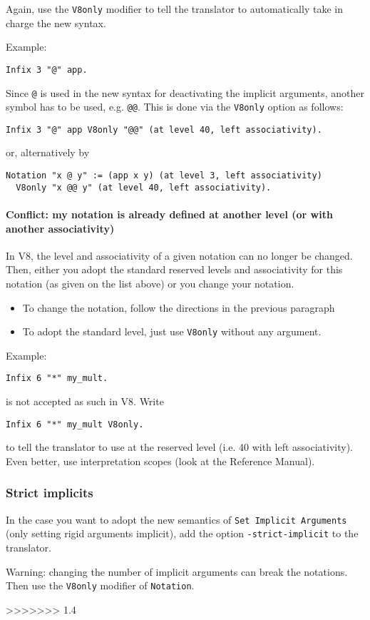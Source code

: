 \documentclass[11pt,a4paper]{article}
\begin{document}
Again, use the {\tt V8only} modifier to tell the translator to
automatically take in charge the new syntax.

Example:
\begin{verbatim}
Infix 3 "@" app.
\end{verbatim}
Since {\tt @} is used in the new syntax for deactivating the implicit
arguments, another symbol has to be used, e.g. {\tt @@}. This is done via
the {\tt V8only} option as follows:
\begin{verbatim}
Infix 3 "@" app V8only "@@" (at level 40, left associativity).
\end{verbatim}
or, alternatively by
\begin{verbatim}
Notation "x @ y" := (app x y) (at level 3, left associativity)
  V8only "x @@ y" (at level 40, left associativity).
\end{verbatim}

\paragraph{Conflict: my notation is already defined at another level
  (or with another associativity)}

In V8, the level and associativity of a given notation can no longer
be changed. Then, either you adopt the standard reserved levels and
associativity for this notation (as given on the list above) or you
change your notation.
\begin{itemize}
\item To change the notation, follow the directions in the previous
paragraph
\item To adopt the standard level, just use {\tt V8only} without any
argument.
\end{itemize}

Example:
\begin{verbatim}
Infix 6 "*" my_mult.
\end{verbatim}
is not accepted as such in V8. Write
\begin{verbatim}
Infix 6 "*" my_mult V8only.
\end{verbatim}
to tell the translator to use {\tt *} at the reserved level (i.e. 40
with left associativity). Even better, use interpretation scopes (look
at the Reference Manual).


\subsubsection{Strict implicits}

In the case you want to adopt the new semantics of {\tt Set Implicit
 Arguments} (only setting rigid arguments implicit), add the option
{\tt -strict-implicit} to the translator.

Warning: changing the number of implicit arguments can break the
notations.  Then use the {\tt V8only} modifier of {\tt Notation}.

>>>>>>> 1.4
\end{document}
